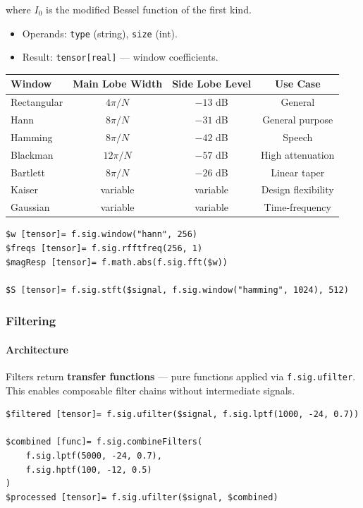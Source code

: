 where $I_0$ is the modified Bessel function of the first kind.

\begin{itemize}
\item Operands: \texttt{type} (string), \texttt{size} (int).
\item Result: \texttt{tensor[real]} --- window coefficients.
\end{itemize}

\begin{tabular}{|l|c|c|c|}
\hline
\textbf{Window} & \textbf{Main Lobe Width} & \textbf{Side Lobe Level} & \textbf{Use Case} \\
\hline
Rectangular & $4\pi/N$ & $-13$ dB & General \\
Hann & $8\pi/N$ & $-31$ dB & General purpose \\
Hamming & $8\pi/N$ & $-42$ dB & Speech \\
Blackman & $12\pi/N$ & $-57$ dB & High attenuation \\
Bartlett & $8\pi/N$ & $-26$ dB & Linear taper \\
Kaiser & variable & variable & Design flexibility \\
Gaussian & variable & variable & Time-frequency \\
\hline
\end{tabular}

\begin{verbatim}
$w [tensor]= f.sig.window("hann", 256)
$freqs [tensor]= f.sig.rfftfreq(256, 1)
$magResp [tensor]= f.math.abs(f.sig.fft($w))

$S [tensor]= f.sig.stft($signal, f.sig.window("hamming", 1024), 512)
\end{verbatim}

\subsubsection{Filtering}

\paragraph{Architecture}
Filters return \textbf{transfer functions} --- pure functions applied via \texttt{f.sig.ufilter}. This enables composable filter chains without intermediate signals.

\begin{verbatim}
$filtered [tensor]= f.sig.ufilter($signal, f.sig.lptf(1000, -24, 0.7))

$combined [func]= f.sig.combineFilters(
    f.sig.lptf(5000, -24, 0.7),
    f.sig.hptf(100, -12, 0.5)
)
$processed [tensor]= f.sig.ufilter($signal, $combined)
\end{verbatim}

